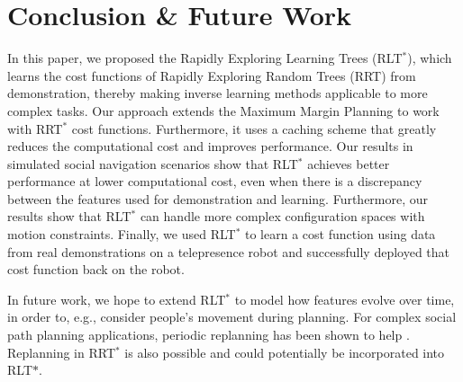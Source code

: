 \documentclass[letterpaper, 10 pt, conference]{ieeeconf}
\begin{document}
\vspace{-1mm}
\section{Conclusion \& Future Work}
In this paper, we proposed the Rapidly Exploring Learning Trees (RLT$^*$), which learns the cost functions of Rapidly Exploring Random Trees (RRT) from demonstration, thereby making inverse learning methods applicable to more complex tasks. Our approach extends the Maximum Margin Planning to work with RRT$^*$ cost functions. Furthermore, it uses a caching scheme that greatly reduces the computational cost and improves performance. Our results in simulated social navigation scenarios show that RLT$^*$ achieves better performance at lower computational cost, even when there is a discrepancy between the features used for demonstration and learning. Furthermore, our results show that RLT$^*$ can handle more complex configuration spaces with motion constraints. Finally, we used RLT$^*$ to learn a cost function using data from real demonstrations on a telepresence robot and successfully deployed that cost function back on the robot.

In future work, we hope to extend RLT$^*$ to model how features evolve over time, in order to, e.g., consider people's movement during planning.  For complex social path planning applications, periodic replanning has been shown to help \cite{vasquez2014inverse,henry2010learning}. Replanning in RRT$^*$ is also possible \cite{otte2015rrtx} and could potentially be incorporated into RLT$*$.



\end{document}
